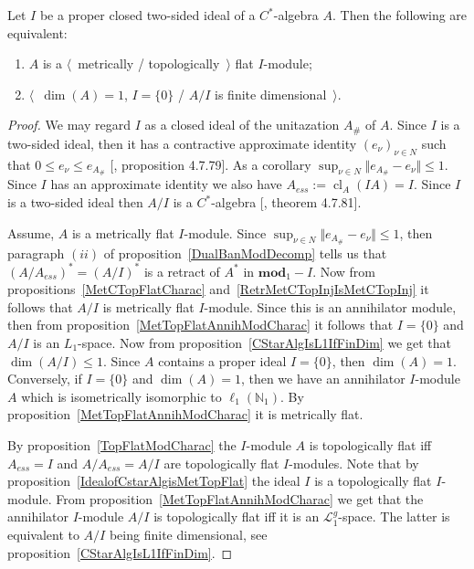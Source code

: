 \begin{proposition}\label{CStarAlgIsTopFlatOverItsIdeal} Let $I$ be a proper
closed two-sided ideal of a  $C^*$-algebra $A$. Then the following are equivalent:

\begin{enumerate}[label = (\roman*)]
    \item $A$ is a $\langle$~metrically / topologically~$\rangle$ flat $I$-module;

    \item $\langle$~$\operatorname{dim}(A)=1$, $I= \{0 \}$ / $A/I$ is finite
    dimensional~$\rangle$.
\end{enumerate}
\end{proposition}
\begin{proof} We may regard $I$ as a closed  ideal of the unitazation $A_\#$ of $A$. Since
$I$ is a two-sided ideal, then it has a contractive approximate identity
${(e_\nu)}_{\nu\in N}$ such that $0\leq e_\nu\leq e_{A_\#}$
[\cite{HelBanLocConvAlg}, proposition 4.7.79]. As a 
corollary $\sup_{\nu\in N}\Vert e_{A_\#}-e_\nu\Vert\leq 1$. Since $I$ has an 
approximate identity we also have $A_{ess}:=\operatorname{cl}_A(IA)=I$. 
Since $I$ is a two-sided ideal then $A/I$ is a $C^*$-algebra 
[\cite{HelBanLocConvAlg}, theorem 4.7.81].

Assume, $A$ is a metrically flat $I$-module. Since 
$\sup_{\nu\in N}\Vert e_{A_\#}-e_\nu\Vert\leq 1$, then paragraph $(ii)$ of
proposition~\ref{DualBanModDecomp} tells us that ${(A/A_{ess})}^*={(A/I)}^*$ is 
a retract of $A^*$ in $\mathbf{mod}_1-I$. Now from
propositions~\ref{MetCTopFlatCharac} and~\ref{RetrMetCTopInjIsMetCTopInj} it
follows that $A/I$ is metrically flat $I$-module. Since this is an annihilator
module, then from proposition~\ref{MetTopFlatAnnihModCharac} it follows that 
$I= \{0 \}$ and $A/I$ is an $L_1$-space. Now from
proposition~\ref{CStarAlgIsL1IfFinDim} we get that 
$\operatorname{dim}(A/I)\leq 1$. Since $A$ contains a proper 
ideal $I= \{0 \}$, then $\operatorname{dim}(A)=1$. Conversely, 
if $I= \{0 \}$ and $\operatorname{dim}(A)=1$, then we have an 
annihilator $I$-module $A$ which is isometrically isomorphic 
to $\ell_1(\mathbb{N}_1)$. By proposition~\ref{MetTopFlatAnnihModCharac} 
it is metrically flat. 

By proposition~\ref{TopFlatModCharac} the $I$-module $A$ is topologically flat
iff $A_{ess}=I$ and $A/A_{ess}=A/I$ are topologically flat $I$-modules. Note that by
proposition~\ref{IdealofCstarAlgisMetTopFlat} the ideal $I$ is a topologically
flat $I$-module. From proposition~\ref{MetTopFlatAnnihModCharac} we get that the 
annihilator $I$-module $A/I$ is topologically flat iff it is an $\mathscr{L}_1^g$-space. 
The latter is equivalent to $A/I$ being finite dimensional, see 
proposition~\ref{CStarAlgIsL1IfFinDim}.
\end{proof}

